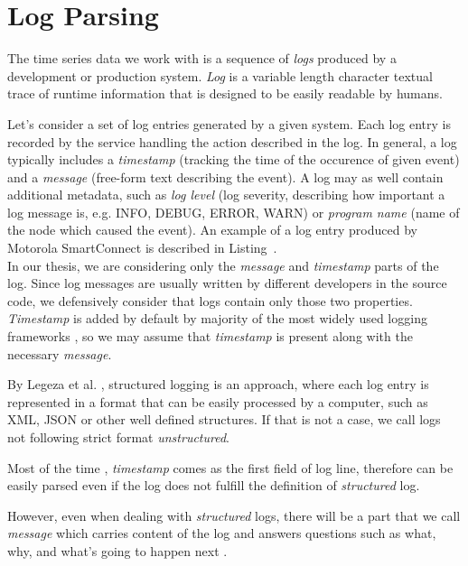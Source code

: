 \section{Log Parsing}

The time series data we work with is a sequence of \textit{logs} produced by a development or production system. 
\textit{Log} is a variable length character textual trace of runtime information that is designed to be easily readable by humans.

Let's consider a set of log entries generated by a given system. Each log entry is recorded by the service handling the action described in the log. In general, a log typically includes a \textit{timestamp} (tracking the time of the occurence of given event) and a \textit{message} (free-form text describing the event). A log may as well contain additional metadata, such as \textit{log level} (log severity, describing how important a log message is, e.g. INFO, DEBUG, ERROR, WARN) or \textit{program name} (name of the node which caused the event). An example of a log entry produced by Motorola SmartConnect is described in Listing~.\\

In our thesis, we are considering only the \textit{message} and \textit{timestamp} parts of the log. Since log messages are usually written by different developers in the source code, we defensively consider that logs contain only those two properties. \textit{Timestamp} is added by default by majority of the most widely used logging frameworks \cite{log4j:example} \cite{serilog:example} \cite{python_log:example}, so we may assume that \textit{timestamp} is present along with the necessary \textit{message}.

By Legeza et al. \cite{structured_logging}, structured logging is an approach, where each log entry is represented in a format that can be easily processed by a computer, such as XML, JSON or other well defined structures. If that is not a case, we call logs not following strict format \textit{unstructured}.

Most of the time \cite{log4j:example} \cite{serilog:example} \cite{python_log:example}, \textit{timestamp} comes as the first field of log line, therefore can be easily parsed even if the log does not fulfill the definition of \textit{structured} log.

However, even when dealing with \textit{structured} logs, there will be a part that we call \textit{message} which carries content of the log and answers questions such as what, why, and what's going to happen next \cite{structured_logging}.\\

